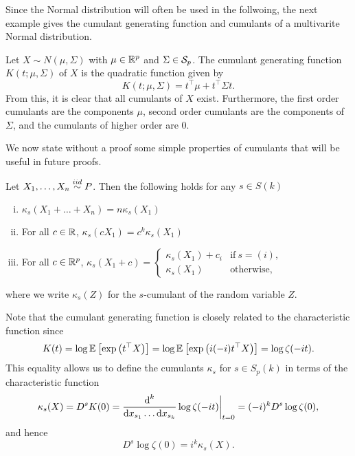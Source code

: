 Since the Normal distribution will often be used in the follwoing, the next example gives the cumulant generating function and cumulants of a multivarite Normal distribution.
\begin{example} \label{ex-cumulants-mvn}
    Let $X \sim N(\mu, \Sigma)$ with $\mu \in {\mathbb{R}^p}$ and $\Sigma \in {\mathcal{S}_p}$. The cumulant generating function $K(t; \mu, \Sigma)$ of $X$ is the quadratic function given by
    \begin{equation*}
        K(t; \mu, \Sigma) = t^\top\mu + t^\top\Sigma t.
    \end{equation*}
    From this, it is clear that all cumulants of $X$ exist. Furthermore, the first order cumulants are the components $\mu$, second order cumulants are the components of $\Sigma$, and the cumulants of higher order are 0.
\end{example}

We now state without a proof some simple properties of cumulants that will be useful in future proofs.
\begin{lemma} \label{lem-cumulants-props}
    Let $X_1, \ldots, X_n \stackrel{iid}{\sim} P$. Then the following holds for any $s \in S(k)$
    \begin{enumerate}[i.]
        \item {
        $\kappa_s(X_1 + \ldots + X_n) = n\kappa_s(X_1)$
        }
        \item {
            For all $c \in \mathbb{R}$, $\kappa_s(c X_1) = c^k\kappa_s(X_1)$
        }
        \item {
            For all $c \in {\mathbb{R}^p}$, $\kappa_s(X_1 + c) =
            \begin{cases}
                \kappa_s(X_1) + c_i &\text{if}\ s=(i),\\
                \kappa_s(X_1)& \text{otherwise},
            \end{cases}$
        }
    \end{enumerate}
    where we write $\kappa_s(Z)$ for the $s$-cumulant of the random variable $Z$.
\end{lemma}

Note that the cumulant generating function is closely related to the characteristic function since
\begin{equation*}
    K(t) 
    = \log \mathbb{E}_{}\left[\exp\left(t^\top X\right)\right] 
    = \log \mathbb{E}_{}\left[\exp\left(i (-i)t^\top X\right)\right]
    = \log \zeta(-it).
\end{equation*}
This equality allows us to define the cumulants $\kappa_s$ for $s \in S_p(k)$ in terms of the characteristic function
\begin{equation*}
    \kappa_s(X) = D^s K(0) 
    = \frac{\text{d}^k}{\text{d} x_{s_1} \ldots \text{d} x_{s_k}} \log \zeta(-it) \bigg|_{t=0}
    = (-i)^{k} D^s \log \zeta(0),
\end{equation*}
and hence
\begin{equation*}
    D^s \log \zeta(0) = i^k \kappa_s(X).
\end{equation*}